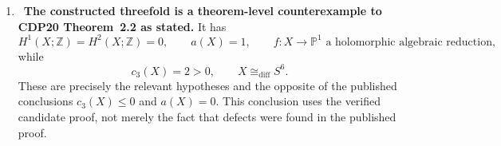 \begin{enumerate}[leftmargin=1.8em,itemsep=.65em]
The toric support-function calculation uses the explicitly typed unimodular
map
\[
 B_0:\bar\Lambda\simeq\mathbb Z^2
 \longrightarrow\Lambda_{\rm tor}\simeq\mathbb Z^2,
 \qquad
 [B_0]=\begin{pmatrix}0&1\\-1&0\end{pmatrix},
 \qquad \det B_0=1.
\]
For adjacent rays $\rho_v,\rho_w<\sigma=\{v,w,u\}$ the affine-open
directions are, exactly,
\[
 U_{\rho_v}=D(z_wz_u)\subset U_\sigma,\qquad
 U_{\rho_w}=D(z_vz_u)\subset U_\sigma,\qquad
 U_{\rho_v}\cap U_{\rho_w}=D(z_vz_wz_u)=U_0.
\]
If
$\mu^+_\lambda:\Psi_\lambda^*\mathcal O(D_a)\to\mathcal O(D_a)$
is multiplication by $\chi^{m_\lambda}$, the map needed on the negative
divisor is the inverse-dual, not the ordinary dual:
\[
 \mu^-_\lambda:=((\mu^+_\lambda)^{-1})^\vee:
 \Psi_\lambda^*\mathcal O(-D_a)\longrightarrow\mathcal O(-D_a),
 \qquad s\longmapsto\chi^{-m_\lambda}s.
\]
Now set, with its type retained,
\[
 M=L|_{N_0}\in\operatorname{Pic}(N_0),\qquad
 E_M=c_1(M|_{F_t})=E=0.
\]
For
$A=\nu^*(M|_W)$ and
$(\deg_{C_1}A,\ldots,\deg_{C_6}A)=(d_1,d_2,d_3,d_1,d_2,d_3)$,
the normalized degrees determine
\[
 [B]=\begin{pmatrix}d_2+d_3&d_3\\d_3&d_1+d_3\end{pmatrix},
 \qquad
 E_M((\lambda,0),(0,m))=-B(B_0\lambda,m).
\]
The antecedent $E_M=0$ and unimodularity of $B_0$ force $B=0$, hence all
six degrees vanish and
\[
 \nu^*(L|_W)=\nu^*(M|_W)\simeq\mathcal O_{E_0};
 \qquad
 r([L])=[\mathcal O_{E_0}]=0
 \quad\text{in }\operatorname{Pic}(E_0)\simeq
 \operatorname{Pic}(\mathrm{dP}_6).
\]
This proof uses neither global Leray
nor local integral specialization.  See
\cref{prop:local-cusp-picard-obstruction,prop:analytic-ah-boundary,%
lem:analytic-support-specialization,thm:analytic-all-picard}.

\item \Verified\ \textbf{The constructed threefold is a theorem-level
counterexample to CDP20 Theorem~2.2 as stated.}
It has
\[
H^1(X;\mathbb Z)=H^2(X;\mathbb Z)=0,\qquad
a(X)=1,\qquad f:X\to\mathbb P^1
\text{ a holomorphic algebraic reduction},
\]
while
\[
c_3(X)=2>0,\qquad X\cong_{\mathrm{diff}}S^6.
\]
These are precisely the relevant hypotheses and the opposite of the
published conclusions \(c_3(X)\le0\) and \(a(X)=0\).  This conclusion uses
the verified candidate proof, not merely the fact that defects were found in
the published proof.


\end{enumerate}
